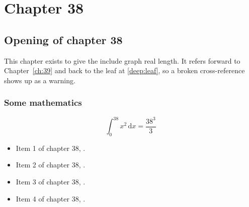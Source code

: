 \chapter{Chapter 38}
\label{ch:38}
\section{Opening of chapter 38}
This chapter exists to give the include graph real length. It refers
forward to Chapter~\ref{ch:39} and back to the leaf
at \ref{deep:leaf}, so a broken cross-reference shows up as a warning.

\subsection{Some mathematics}
\begin{equation}
  \int_0^{38} x^{2} \, \mathrm{d}x = \frac{38^{3}}{3}
\end{equation}

\begin{itemize}
  \item Item 1 of chapter 38, .
  \item Item 2 of chapter 38, .
  \item Item 3 of chapter 38, .
  \item Item 4 of chapter 38, .
\end{itemize}
